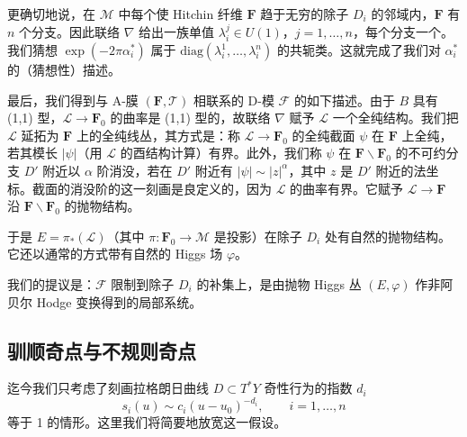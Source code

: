 更确切地说，在 $\mathcal{M}$ 中每个使 Hitchin 纤维 $\boldsymbol{F}$ 趋于无穷的除子 $D_i$ 的邻域内，$\boldsymbol{F}$ 有 $n$ 个分支。因此联络 $\nabla$ 给出一族单值 $\lambda_i^j\in U(1)$，$j=1,\dots,n$，每个分支一个。我们猜想 $\exp(-2\pi\alpha_i^*)$ 属于 $\mathrm{diag}(\lambda_i^1,\dots,\lambda_i^n)$ 的共轭类。这就完成了我们对 $\alpha_i^*$ 的（猜想性）描述。

最后，我们得到与 A-膜 $(\boldsymbol{F},\mathcal{T})$ 相联系的 D-模 $\mathcal{F}$ 的如下描述。由于 $B$ 具有 (1,1) 型，$\mathcal{L}\to\boldsymbol{F}_0$ 的曲率是 (1,1) 型的，故联络 $\nabla$ 赋予 $\mathcal{L}$ 一个全纯结构。我们把 $\mathcal{L}$ 延拓为 $\boldsymbol{F}$ 上的全纯线丛，其方式是：称 $\mathcal{L}\to\boldsymbol{F}_0$ 的全纯截面 $\psi$ 在 $\boldsymbol{F}$ 上全纯，若其模长 $|\psi|$（用 $\mathcal{L}$ 的酉结构计算）有界。此外，我们称 $\psi$ 在 $\boldsymbol{F}\backslash\boldsymbol{F}_0$ 的不可约分支 $D'$ 附近以 $\alpha$ 阶消没，若在 $D'$ 附近有 $|\psi|\sim|z|^{\alpha}$，其中 $z$ 是 $D'$ 附近的法坐标。截面的消没阶的这一刻画是良定义的，因为 $\mathcal{L}$ 的曲率有界。它赋予 $\mathcal{L}\to\boldsymbol{F}$ 沿 $\boldsymbol{F}\backslash\boldsymbol{F}_0$ 的抛物结构。

于是 $E=\pi_*(\mathcal{L})$（其中 $\pi:\boldsymbol{F}_0\to\mathcal{M}$ 是投影）在除子 $D_i$ 处有自然的抛物结构。它还以通常的方式带有自然的 Higgs 场 $\varphi$。

我们的提议是：$\mathcal{F}$ 限制到除子 $D_i$ 的补集上，是由抛物 Higgs 丛 $(E,\varphi)$ 作非阿贝尔 Hodge 变换得到的局部系统。


\subsection{驯顺奇点与不规则奇点}

迄今我们只考虑了刻画拉格朗日曲线 $D\subset T^*Y$ 奇性行为的指数 $d_i$
\begin{equation}\tag{4.25}
s_i(u)\sim c_i(u-u_0)^{-d_i},\qquad i=1,\dots,n
\end{equation}
等于 1 的情形。这里我们将简要地放宽这一假设。

